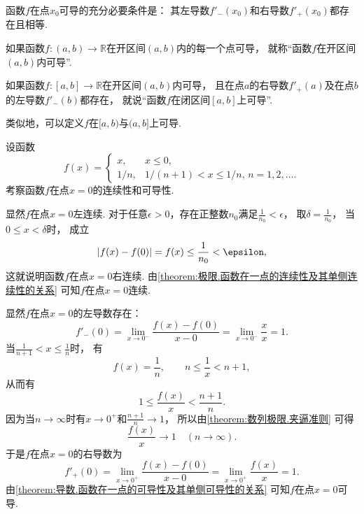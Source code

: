 \begin{theorem}[导数存在的充分必要条件]\label{theorem:导数.函数在一点的可导性及其单侧可导性的关系}
函数\(f\)在点\(x_0\)可导的充分必要条件是：
其左导数\(f'_-(x_0)\)和右导数\(f'_+(x_0)\)都存在且相等.
\end{theorem}

\begin{definition}\label{definition:导数.函数在开区间内可导}
如果函数\(f\colon(a,b)\to\mathbb{R}\)在开区间\((a,b)\)内的每一个点可导，
就称“函数\(f\)在开区间\((a,b)\)内可导”.
\end{definition}

\begin{definition}\label{definition:导数.函数在闭区间上可导}
如果函数\(f\colon[a,b]\to\mathbb{R}\)在开区间\((a,b)\)内可导，
且在点\(a\)的右导数\(f'_+(a)\)及在点\(b\)的左导数\(f'_-(b)\)都存在，
就说“函数\(f\)在闭区间\([a,b]\)上可导”.
\end{definition}

类似地，可以定义\(f\)在\([a,b)\)与\((a,b]\)上可导.

\begin{example}
设函数\[
	f(x) = \left\{ \begin{array}{cl}
		x, & x\leq0, \\
		1/n, & 1/(n+1)<x\leq1/n,\,n=1,2,\dotsc.
	\end{array} \right.
\]
考察函数\(f\)在点\(x=0\)的连续性和可导性.
\begin{solution}
显然\(f\)在点\(x=0\)左连续.
对于任意\(\epsilon>0\)，存在正整数\(n_0\)满足\(\frac1{n_0}<\epsilon\)，
取\(\delta=\frac1{n_0}\)，
当\(0 \leq x < \delta\)时，
成立\[
	\abs{f(x) - f(0)}
	= f(x)
	\leq \frac1{n_0}
	< \epsilon,
\]
这就说明函数\(f\)在点\(x=0\)右连续.
由\cref{theorem:极限.函数在一点的连续性及其单侧连续性的关系} 可知\(f\)在点\(x=0\)连续.

显然\(f\)在点\(x=0\)的左导数存在：\[
	f'_-(0) = \lim_{x\to0^-} \frac{f(x) - f(0)}{x - 0}
	= \lim_{x\to0^-} \frac{x}{x}
	= 1.
\]
当\(\frac1{n+1} < x \leq \frac1n\)时，
有\[
	f(x) = \frac1n,
	\qquad
	n \leq \frac1x < n+1,
\]
从而有\[
	1 \leq \frac{f(x)}{x} < \frac{n+1}{n}.
\]
因为当\(n\to\infty\)时有\(x\to0^+\)和\(\frac{n+1}{n}\to1\)，
所以由\cref{theorem:数列极限.夹逼准则} 可得\[
	\frac{f(x)}{x} \to 1
	\quad(n\to\infty).
\]
于是\(f\)在点\(x=0\)的右导数为\[
	f'_+(0) = \lim_{x\to0^+} \frac{f(x) - f(0)}{x - 0}
	= \lim_{x\to0^+} \frac{f(x)}{x}
	= 1.
\]
由\cref{theorem:导数.函数在一点的可导性及其单侧可导性的关系} 可知\(f\)在点\(x=0\)可导.
\end{solution}
\end{example}


